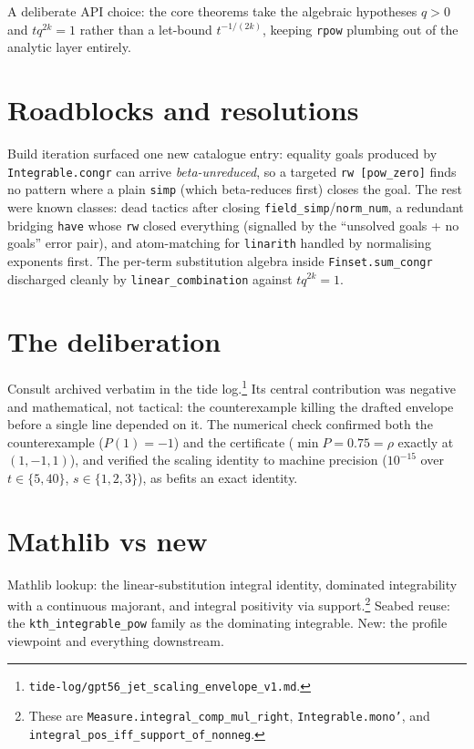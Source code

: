\documentclass[11pt]{article}
\begin{document}
A deliberate API choice: the core theorems take the algebraic
hypotheses $q > 0$ and $t q^{2k} = 1$ rather than a let-bound
$t^{-1/(2k)}$, keeping \texttt{rpow} plumbing out of the analytic
layer entirely.

\section{Roadblocks and resolutions}

Build iteration surfaced one new catalogue entry: equality goals
produced by \texttt{Integrable.congr} can arrive
\emph{beta-unreduced}, so a targeted \texttt{rw [pow\_zero]} finds no
pattern where a plain \texttt{simp} (which beta-reduces first)
closes the goal. The rest were known classes: dead tactics after
closing \texttt{field\_simp}/\texttt{norm\_num}, a redundant bridging
\texttt{have} whose \texttt{rw} closed everything (signalled by the
``unsolved goals + no goals'' error pair), and atom-matching for
\texttt{linarith} handled by normalising exponents first. The
per-term substitution algebra inside \texttt{Finset.sum\_congr}
discharged cleanly by \texttt{linear\_combination} against
$t q^{2k} = 1$.

\section{The deliberation}

Consult archived verbatim in the tide log.\footnote{%
\texttt{tide-log/gpt56\_jet\_scaling\_envelope\_v1.md}.} Its central
contribution was negative and mathematical, not tactical: the
counterexample killing the drafted envelope before a single line
depended on it. The numerical check confirmed both the counterexample
($P(1) = -1$) and the certificate ($\min P = 0.75 = \rho$ exactly at
$(1, -1, 1)$), and verified the scaling identity to machine precision
($10^{-15}$ over $t \in \{5, 40\}$, $s \in \{1,2,3\}$), as befits an
exact identity.

\section{Mathlib vs new}

Mathlib lookup: the linear-substitution integral identity, dominated
integrability with a continuous majorant, and integral positivity via
support.\footnote{These are
\texttt{Measure.}\allowbreak\texttt{integral\_comp\_mul\_right},
\texttt{Integrable.mono'}, and
\texttt{integral\_pos\_iff\_support\_of\_nonneg}.} Seabed reuse: the
\texttt{kth\_integrable\_pow} family as the dominating integrable.
New: the profile viewpoint and everything downstream.
\end{document}
